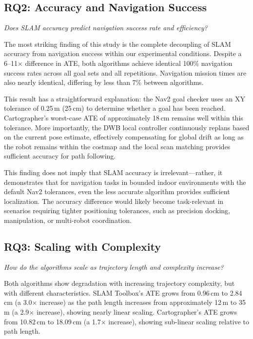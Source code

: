 \subsection{RQ2: Accuracy and Navigation Success}

\emph{Does SLAM accuracy predict navigation success rate and efficiency?}

The most striking finding of this study is the complete decoupling of SLAM accuracy from navigation success within our experimental conditions. Despite a 6--11$\times$ difference in ATE, both algorithms achieve identical 100\% navigation success rates across all goal sets and all repetitions. Navigation mission times are also nearly identical, differing by less than 7\% between algorithms.

This result has a straightforward explanation: the Nav2 goal checker uses an XY tolerance of 0.25\,m (25\,cm) to determine whether a goal has been reached. Cartographer's worst-case ATE of approximately 18\,cm remains well within this tolerance. More importantly, the DWB local controller continuously replans based on the current pose estimate, effectively compensating for global drift as long as the robot remains within the costmap and the local scan matching provides sufficient accuracy for path following.

This finding does not imply that SLAM accuracy is irrelevant---rather, it demonstrates that for navigation tasks in bounded indoor environments with the default Nav2 tolerances, even the less accurate algorithm provides sufficient localization. The accuracy difference would likely become task-relevant in scenarios requiring tighter positioning tolerances, such as precision docking, manipulation, or multi-robot coordination.

\subsection{RQ3: Scaling with Complexity}

\emph{How do the algorithms scale as trajectory length and complexity increase?}

Both algorithms show degradation with increasing trajectory complexity, but with different characteristics. SLAM Toolbox's ATE grows from 0.96\,cm to 2.84\,cm (a 3.0$\times$ increase) as the path length increases from approximately 12\,m to 35\,m (a 2.9$\times$ increase), showing nearly linear scaling. Cartographer's ATE grows from 10.82\,cm to 18.09\,cm (a 1.7$\times$ increase), showing sub-linear scaling relative to path length.

